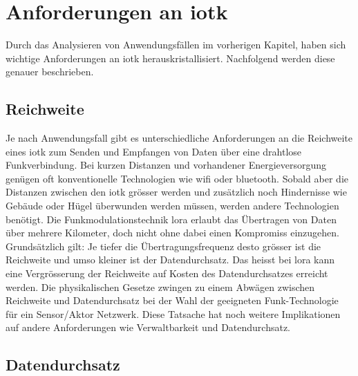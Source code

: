 \chapter{Anforderungen an \gls{iotk}}

Durch das Analysieren von Anwendungsfällen im vorherigen Kapitel, haben sich wichtige Anforderungen an \gls{iotk} herauskristallisiert. Nachfolgend werden diese genauer beschrieben.

\section{Reichweite}

Je nach Anwendungsfall gibt es unterschiedliche Anforderungen an die Reichweite eines \gls{iotk} zum Senden und Empfangen von Daten über eine drahtlose Funkverbindung. Bei kurzen Distanzen und vorhandener Energieversorgung genügen oft konventionelle Technologien wie \gls{wifi} oder \gls{bluetooth}. Sobald aber die Distanzen zwischen den \gls{iotk} grösser werden und zusätzlich noch Hindernisse wie Gebäude oder Hügel überwunden werden müssen, werden andere Technologien benötigt. Die Funkmodulationstechnik \gls{lora} erlaubt das Übertragen von Daten über mehrere Kilometer, doch nicht ohne dabei einen Kompromiss einzugehen. Grundsätzlich gilt: Je tiefer die Übertragungsfrequenz desto grösser ist die Reichweite und umso kleiner ist der Datendurchsatz. Das heisst bei \gls{lora} kann eine Vergrösserung der Reichweite auf Kosten des Datendurchsatzes erreicht werden. Die physikalischen Gesetze zwingen zu einem Abwägen zwischen Reichweite und Datendurchsatz bei der Wahl der geeigneten Funk-Technologie für ein Sensor/Aktor Netzwerk. Diese Tatsache hat noch weitere Implikationen auf andere Anforderungen wie Verwaltbarkeit und Datendurchsatz.

\section{Datendurchsatz}

